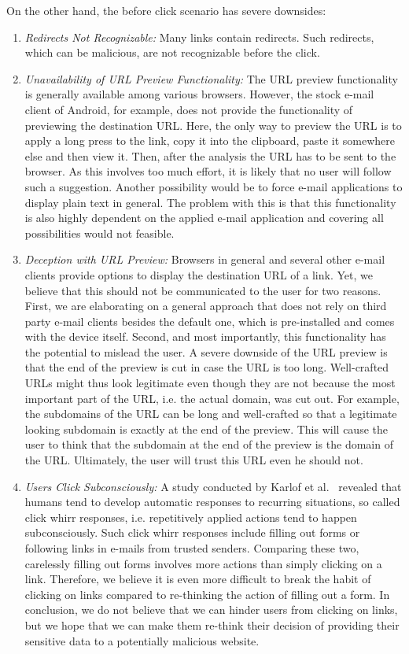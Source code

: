 \begin{description}[leftmargin=0cm]
On the other hand, the before click scenario has severe downsides:

\begin{enumerate}
	\item \textit{Redirects Not Recognizable:} Many links contain redirects. Such redirects, which can be malicious, are not recognizable before the click.
	\item \textit{Unavailability of URL Preview Functionality:} The URL preview functionality is generally available among various browsers. 
However, the stock e-mail client of Android, for example, does not provide the functionality of previewing the destination URL. 
Here, the only way to preview the URL is to apply a long press to the link, copy it into the clipboard, paste it somewhere else and then view it. 
Then, after the analysis the URL has to be sent to the browser.
As this involves too much effort, it is likely that no user will follow such a suggestion.
Another possibility would be to force e-mail applications to display plain text in general.
The problem with this is that this functionality is also highly dependent on the applied e-mail application and covering all possibilities would not feasible.
	\item \textit{Deception with URL Preview:} Browsers in general and several other e-mail clients provide options to display the destination URL of a link.
Yet, we believe that this should not be communicated to the user for two reasons.
First, we are elaborating on a general approach that does not rely on third party e-mail clients besides the default one, which is pre-installed and comes with the device itself.
Second, and most importantly, this functionality has the potential to mislead the user.
A severe downside of the URL preview is that the end of the preview is cut in case the URL is too long.
 Well-crafted URLs might thus look legitimate even though they are not because the most important part of the URL, i.e. the actual domain, was cut out.
 For example, the subdomains of the URL can be long and well-crafted so that a legitimate looking subdomain is exactly at the end of the preview.
 This will cause the user to think that the subdomain at the end of the preview is the domain of the URL.
 Ultimately, the user will trust this URL even he should not.
\item \textit{Users Click Subconsciously:} A study conducted by Karlof et al.~\cite{karlof2009conditioned} revealed that humans tend to develop automatic responses to recurring situations, so called click whirr responses, i.e. repetitively applied actions tend to happen subconsciously. Such click whirr responses include filling out forms or following links in e-mails from trusted senders. Comparing these two, carelessly filling out forms involves more actions than simply clicking on a link.
Therefore, we believe it is even more difficult to break the habit of clicking on links compared to re-thinking the action of filling out a form.
In conclusion, we do not believe that we can hinder users from clicking on links, but we hope that we can make them re-think their decision of providing their sensitive data to a potentially malicious website.
\end{enumerate}


\end{description}
